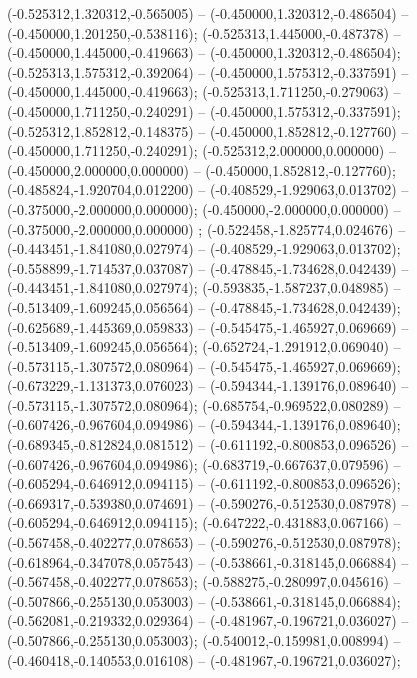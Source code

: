  (-0.525312,1.320312,-0.565005) -- (-0.450000,1.320312,-0.486504) -- (-0.450000,1.201250,-0.538116);
 (-0.525313,1.445000,-0.487378) -- (-0.450000,1.445000,-0.419663) -- (-0.450000,1.320312,-0.486504);
 (-0.525313,1.575312,-0.392064) -- (-0.450000,1.575312,-0.337591) -- (-0.450000,1.445000,-0.419663);
 (-0.525313,1.711250,-0.279063) -- (-0.450000,1.711250,-0.240291) -- (-0.450000,1.575312,-0.337591);
 (-0.525312,1.852812,-0.148375) -- (-0.450000,1.852812,-0.127760) -- (-0.450000,1.711250,-0.240291);
 (-0.525312,2.000000,0.000000) -- (-0.450000,2.000000,0.000000) -- (-0.450000,1.852812,-0.127760);
 (-0.485824,-1.920704,0.012200) -- (-0.408529,-1.929063,0.013702) -- (-0.375000,-2.000000,0.000000);
 (-0.450000,-2.000000,0.000000) -- (-0.375000,-2.000000,0.000000) ;
 (-0.522458,-1.825774,0.024676) -- (-0.443451,-1.841080,0.027974) -- (-0.408529,-1.929063,0.013702);
 (-0.558899,-1.714537,0.037087) -- (-0.478845,-1.734628,0.042439) -- (-0.443451,-1.841080,0.027974);
 (-0.593835,-1.587237,0.048985) -- (-0.513409,-1.609245,0.056564) -- (-0.478845,-1.734628,0.042439);
 (-0.625689,-1.445369,0.059833) -- (-0.545475,-1.465927,0.069669) -- (-0.513409,-1.609245,0.056564);
 (-0.652724,-1.291912,0.069040) -- (-0.573115,-1.307572,0.080964) -- (-0.545475,-1.465927,0.069669);
 (-0.673229,-1.131373,0.076023) -- (-0.594344,-1.139176,0.089640) -- (-0.573115,-1.307572,0.080964);
 (-0.685754,-0.969522,0.080289) -- (-0.607426,-0.967604,0.094986) -- (-0.594344,-1.139176,0.089640);
 (-0.689345,-0.812824,0.081512) -- (-0.611192,-0.800853,0.096526) -- (-0.607426,-0.967604,0.094986);
 (-0.683719,-0.667637,0.079596) -- (-0.605294,-0.646912,0.094115) -- (-0.611192,-0.800853,0.096526);
 (-0.669317,-0.539380,0.074691) -- (-0.590276,-0.512530,0.087978) -- (-0.605294,-0.646912,0.094115);
 (-0.647222,-0.431883,0.067166) -- (-0.567458,-0.402277,0.078653) -- (-0.590276,-0.512530,0.087978);
 (-0.618964,-0.347078,0.057543) -- (-0.538661,-0.318145,0.066884) -- (-0.567458,-0.402277,0.078653);
 (-0.588275,-0.280997,0.045616) -- (-0.507866,-0.255130,0.053003) -- (-0.538661,-0.318145,0.066884);
 (-0.562081,-0.219332,0.029364) -- (-0.481967,-0.196721,0.036027) -- (-0.507866,-0.255130,0.053003);
 (-0.540012,-0.159981,0.008994) -- (-0.460418,-0.140553,0.016108) -- (-0.481967,-0.196721,0.036027);
